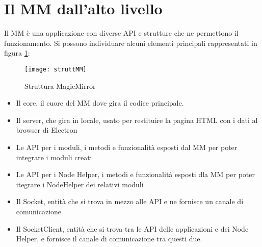\section{Il MM dall'alto livello}\label{cap:MMalto}
Il MM \`e una applicazione con diverse API e strutture che ne permettono il funzionamento.
Si possono individuare alcuni elementi principali rappresentati in figura \ref{fig:struttMM}:
\begin{figure}[H]
    \texttt{[image: struttMM]}
    \caption{Struttura MagicMirror}
    \label{fig:struttMM}
\end{figure}
\begin{itemize}
\item Il core, il cuore del MM dove gira il codice principale.
\item Il server, che gira in locale, usato per restituire la pagina HTML con i dati al browser di Electron
\item Le API per i moduli, i metodi e funzionalit\`a esposti dal MM per poter integrare i moduli creati
\item Le API per i Node Helper, i metodi e funzionalit\`a esposti dla MM per poter itegrare i NodeHelper
dei relativi moduli
\item Il Socket, entit\`a che si trova in mezzo alle API e ne fornisce un canale di comunicazione
\item Il SocketClient, entit\`a che si trova tra le API delle applicazioni e dei Node Helper, e fornisce il canale
di comunicazione tra questi due.\\[2\baselineskip]
\end{itemize}

